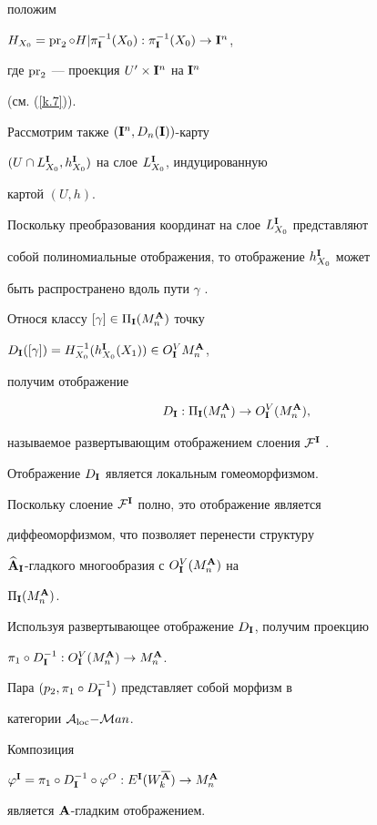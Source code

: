 \begin{pf}
положим


$H_{X_0}=\pr_2\circ H|\pi^{-1}_{\I}(X_0):


\pi^{-1}_{\I}(X_0)\to\I^n$,


где $\operatorname{pr}_2$ --- проекция $U'\times{\bold I}^n$ на ${\bold I}^n$


(см. (\ref{k.7})).


Рассмотрим также $({\bold I}^n,D_n({\bold I}))$-карту


$(U\cap L^{\bold I}_{X_0},h^{\bold I}_{X_0})$ на слое $L^{\bold I}_{X_0}$, индуцированную


картой $(U,h)$.


Поскольку преобразования координат на слое $L^{\bold I}_{X_0}$ представляют


собой полиномиальные отображения, то отображение $h^{\bold I}_{X_0}$ может


быть распространено вдоль пути $\gamma$ \cite{Apan}.


Относя классу $[\gamma]\in\Pi_{\bold I}(M^{\bold A}_n)$ точку


$D_{\bold I}([\gamma])=H_{X_0}^{-1}(h^{\bold I}_{X_0}(X_1))\in O^V_{\bold I} M^{\bold A}_n$,


получим отображение


$$


D_\I:\Pi_\I(M^\A_n)\to O^V_\I(M^\A_n),


$$


называемое развертывающим отображением слоения ${\cal F}^{\bold I}$ \cite{VSh3}.


Отображение $D_{\bold I}$ является локальным гомеоморфизмом.


Поскольку слоение ${\cal F}^{{\bold I}}$ полно, это отображение является


диффеоморфизмом, что позволяет перенести структуру


$\widehat{{\bold A}}_{\bold I}$-гладкого многообразия с $O^V_{\bold I}(M^{\bold A}_n)$ на


$\Pi_{\bold I}(M^{\bold A}_n)$.


Используя развертывающее отображение $D_{\bold I}$, получим проекцию


$\pi_1\circ D^{-1}_{\bold I}:O^V_{\bold I}(M^{\bold A}_n)\to M^{\bold A}_n$.


Пара $(p_2,\pi_1\circ D^{-1}_{\bold I})$ представляет собой морфизм в


категории ${\cal A}_{\operatorname{loc}}{-}{\cal M}an$.


Композиция


$\varphi^\I=\pi_1\circ D^{-1}_\I\circ\varphi^O:


E^\I(W^{\overline\A}_k)\to M^\A_n$


является ${\bold A}$-гладким отображением.



\end{pf}
